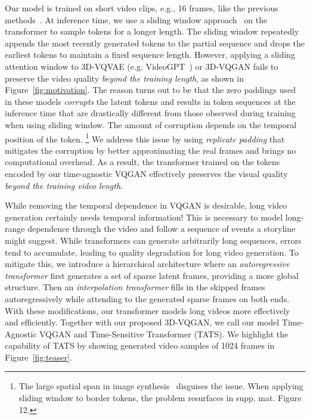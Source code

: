 Our model is trained on short video clips, e.g., 16 frames, like the previous methods~\cite{vondrick2016generating,saito2017temporal,Tulyakov_2018_CVPR,clark2019adversarial,saito2020train,tian2021a}.
At inference time, we use a sliding window approach~\cite{brown2020language} on the transformer to sample tokens for a longer length. 
The sliding window repeatedly appends the most recently generated tokens to the partial sequence and drops the earliest tokens to maintain a fixed sequence length. 
However, applying a sliding attention window to 3D-VQVAE (e.g. VideoGPT~\cite{yan2021videogpt}) or 3D-VQGAN fails to preserve the video quality \emph{beyond the training length}, as shown in Figure~\ref{fig:motivation}.
The reason turns out to be that the zero paddings used in these models \emph{corrupts} the latent tokens and results in token sequences at the inference time that are drastically different from those observed during training when using sliding window.
The amount of corruption depends on the temporal position of the token.
\footnote{The large spatial span in image synthesis~\cite{esser2021taming} disguises the issue. 
When applying sliding window to border tokens, the problem resurfaces in supp. mat. Figure 12.}
We address this issue by using \emph{replicate padding} that mitigates the corruption by better approximating the real frames and brings no computational overhead.
As a result, the transformer trained on the tokens encoded by our time-agnostic VQGAN effectively preserves the visual quality \emph{beyond the training video length}.


While removing the temporal dependence in VQGAN is desirable, long video generation certainly needs temporal information! 
This is necessary to model long-range dependence through the video and follow a sequence of events a storyline might suggest.
While transformers can generate arbitrarily long sequences, errors tend to accumulate, leading to quality degradation for long video generation. 
To mitigate this, we introduce a hierarchical architecture where an \emph{autoregressive transformer} first generates a set of sparse latent frames, providing a more global structure. Then an \emph{interpolation transformer} fills in the skipped frames autoregressively while attending to the generated sparse frames on both ends.
With these modifications, our transformer models long videos more effectively and efficiently. 
Together with our proposed 3D-VQGAN, we call our model Time-Agnostic VQGAN and Time-Sensitive Transformer (TATS). 
We highlight the capability of TATS by showing generated video samples of 1024 frames in Figure~\ref{fig:teaser}.

